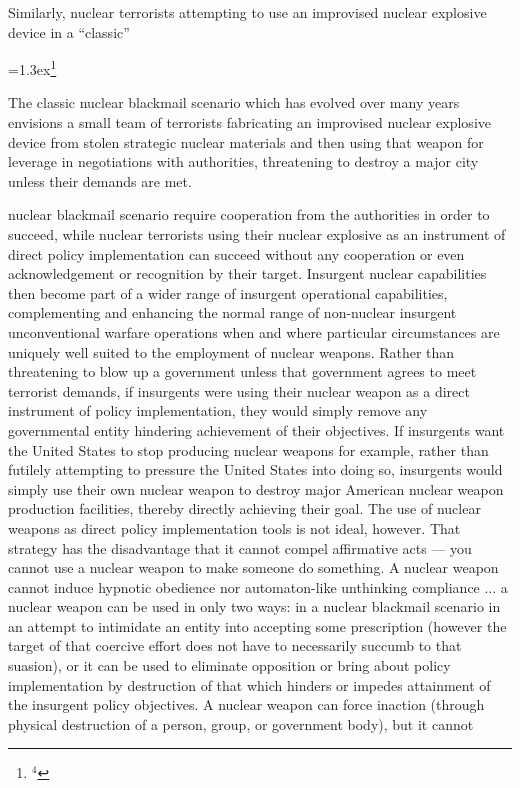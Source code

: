 Similarly, nuclear terrorists attempting to use an improvised nuclear
explosive device in a 
``classic''{\baselineskip=1.3ex\footnote{$^{4}$}{The classic nuclear
blackmail scenario which has evolved over many years envisions a small team
of terrorists fabricating an improvised nuclear explosive device from stolen
strategic nuclear materials and then using that weapon for leverage in 
negotiations with authorities, threatening to destroy a major city unless 
their demands are met.\par}} nuclear blackmail scenario require cooperation
from the authorities in order to succeed, while nuclear terrorists using
their nuclear explosive as an instrument of direct policy implementation can
succeed without any cooperation or even acknowledgement or recognition by
their target. Insurgent nuclear capabilities then become part of a wider range
of insurgent operational capabilities, complementing and enhancing the normal
range of non-nuclear insurgent unconventional warfare operations when and where
particular circumstances are uniquely well suited to the employment of nuclear
weapons. Rather than threatening to blow up a government unless that 
government agrees to meet terrorist demands, if insurgents were using their
nuclear weapon as a direct instrument of policy implementation, they would
simply remove any governmental entity hindering achievement of their 
objectives. If insurgents want the United States to stop producing nuclear
weapons for example, rather than futilely attempting to pressure the United
States into doing so, insurgents would simply use their own nuclear weapon to
destroy major American nuclear weapon production facilities, thereby directly
achieving their goal.
\bigskip
The use of nuclear weapons as direct policy implementation tools is not ideal,
however. That strategy has the disadvantage that it cannot compel
affirmative acts --- you cannot use a nuclear weapon to make someone do
something. A nuclear weapon cannot induce hypnotic obedience nor
automaton-like unthinking compliance $\ldots$ a nuclear weapon can be used 
in only two ways: in a nuclear blackmail scenario in an attempt to intimidate
an entity into accepting some prescription (however the target of that
coercive effort does not have to necessarily succumb to that suasion), or
it can be used to eliminate opposition or bring about policy implementation
by destruction of that which hinders or impedes attainment of the
insurgent policy objectives. A nuclear weapon can force inaction (through
physical destruction of a person, group, or government body), but it cannot
